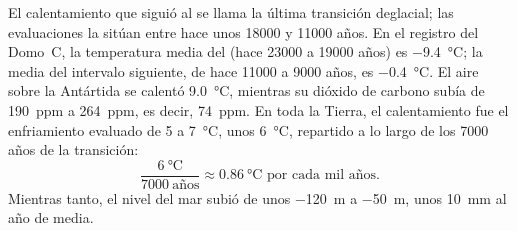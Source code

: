 \begin{example}
El calentamiento que siguió al  se llama la última
transición deglacial; las evaluaciones la sitúan entre hace unos \num{18000} y
\num{11000} años. En el registro del Domo~C, la temperatura media del
 (hace \num{23000} a \num{19000} años) es
\qty{-9.4}{\degreeCelsius}; la media del intervalo siguiente, de hace \num{11000} a
\num{9000} años, es \qty{-0.4}{\degreeCelsius}. El aire sobre la Antártida
se calentó \qty{9.0}{\degreeCelsius}, mientras su dióxido de carbono subía de
\qty{190}{ppm} a \qty{264}{ppm}, es decir, \qty{74}{ppm}. En toda la Tierra,
el calentamiento fue el enfriamiento evaluado de 5 a \qty{7}{\degreeCelsius}, unos
\qty{6}{\degreeCelsius}, repartido a lo largo de los \num{7000} años de la transición:
\[
  \frac{\qty{6}{\degreeCelsius}}{\num{7000}\ \text{años}} \approx
  \qty{0.86}{\degreeCelsius} \text{ por cada mil años.}
\]
Mientras tanto, el nivel del mar subió de unos \qty{-120}{m} a \qty{-50}{m}, unos
\qty{10}{mm} al año de media.
\end{example}

